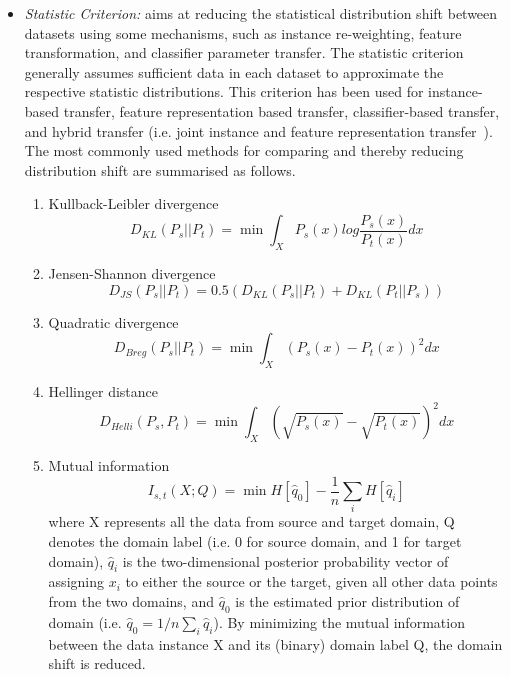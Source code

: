 \documentclass[prodmode]{acmsmall}  %
\begin{document}
\begin{itemize}
\item \textit{Statistic Criterion:} aims at reducing the statistical distribution shift between datasets using some mechanisms, such as instance re-weighting, feature transformation, and classifier parameter transfer. The statistic criterion generally assumes sufficient data in each dataset to approximate the respective statistic distributions. This criterion has been used for instance-based transfer, feature representation based transfer, classifier-based transfer, and hybrid transfer (i.e. joint instance and feature representation transfer~\cite{Long2014,Aljundi2015}). 
The most commonly used methods for comparing and thereby reducing distribution shift are summarised as follows.

\begin{enumerate}
\item Kullback-Leibler divergence~\cite{Sugiyama2008}
\begin{equation}
D_{KL}(P_s||P_t) = \min \int_{X}P_s(x)log\frac{P_s(x)}{P_t(x)}dx
\end{equation}
\item Jensen-Shannon divergence~\cite{Quanz2012}
\begin{equation}
D_{JS}(P_s||P_t) = 0.5(D_{KL}(P_s||P_t)+D_{KL}(P_t||P_s))
\end{equation}
\item Quadratic divergence~\cite{Si2010}
\begin{equation}
D_{Breg}(P_s||P_t) = \min \int_{X}(P_s(x)-P_t(x))^2dx
\end{equation}
\item Hellinger distance~\cite{Baktashmotlagh2014}
\begin{equation}
D_{Helli}(P_s,P_t) = \min \int_{X}(\sqrt{P_s(x)}-\sqrt{P_t(x)})^2dx
\end{equation}
\item Mutual information~\cite{Shi2012}
\begin{equation}
I_{s,t}(X;Q) = \min H[\hat{q}_0]-\frac{1}{n}\sum_i H[\hat{q}_i]
\end{equation}
where X represents all the data from source and target domain, Q denotes the domain label (i.e. 0 for source domain, and 1 for target domain), $\hat{q}_i$ is the two-dimensional posterior probability vector of assigning $x_i$ to either the source or the target, given all other data points from the two domains, and $\hat{q}_0$ is the estimated prior distribution of domain (i.e. $\hat{q}_0 = 1/n\sum_i \hat{q}_i$). By minimizing the mutual information between the data instance X and its (binary) domain label Q, the domain shift is reduced.

\end{enumerate}
\end{itemize}
\end{document}
